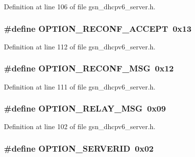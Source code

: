 Definition at line 106 of file gsn\_\-dhcpv6\_\-server.h.

\hypertarget{a00483_a69f013e566daff7e6b8ec286a94221c8}{
\subsubsection[{OPTION\_\-RECONF\_\-ACCEPT}]{\setlength{\rightskip}{0pt plus 5cm}\#define OPTION\_\-RECONF\_\-ACCEPT~0x13}}
\label{a00483_a69f013e566daff7e6b8ec286a94221c8}


Definition at line 112 of file gsn\_\-dhcpv6\_\-server.h.

\hypertarget{a00483_a1c047b46fa235e8f41b3680aa139a4df}{
\subsubsection[{OPTION\_\-RECONF\_\-MSG}]{\setlength{\rightskip}{0pt plus 5cm}\#define OPTION\_\-RECONF\_\-MSG~0x12}}
\label{a00483_a1c047b46fa235e8f41b3680aa139a4df}


Definition at line 111 of file gsn\_\-dhcpv6\_\-server.h.

\hypertarget{a00483_a8fe8cf1baed9b7ab90125059271a38a6}{
\subsubsection[{OPTION\_\-RELAY\_\-MSG}]{\setlength{\rightskip}{0pt plus 5cm}\#define OPTION\_\-RELAY\_\-MSG~0x09}}
\label{a00483_a8fe8cf1baed9b7ab90125059271a38a6}


Definition at line 102 of file gsn\_\-dhcpv6\_\-server.h.

\hypertarget{a00483_a05aee2eeda94c9918d3e3baa9ad941b5}{
\subsubsection[{OPTION\_\-SERVERID}]{\setlength{\rightskip}{0pt plus 5cm}\#define OPTION\_\-SERVERID~0x02}}
\label{a00483_a05aee2eeda94c9918d3e3baa9ad941b5}


